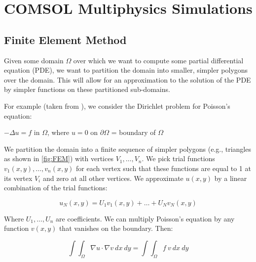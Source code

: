 \documentclass[%
 reprint,
nofootinbib,
 amsmath,amssymb,
 aps,
]{revtex4-2}
\begin{document}

\newpage
\appendix

\section{COMSOL Multiphysics Simulations}


\subsection{Finite Element Method}\label{FEM_method_Strauss}
Given some domain $\Omega$ over which we want to compute some partial differential equation (PDE), we want to partition the domain into smaller, simpler polygons over the domain. This will allow for an approximation to the solution of the PDE by simpler functions on these partitioned sub-domains.
\newline

For example (taken from \cite{Strauss_PDES}), we consider the Dirichlet problem for Poisson's equation:

\begin{center}
$ -\Delta u = f $ in $\Omega$, where $u = 0$ on $\partial \Omega$ =  boundary of $\Omega$ 
\newline
\end{center}

We partition the domain into a finite sequence of simpler polygons (e.g., triangles as shown in \ref{fig:FEM}) with vertices $V_1, \dots ,V_n$. We pick trial functions $v_1(x,y), \dots , v_n(x,y)$ for each vertex such that these functions are equal to 1 at its vertex $V_i$ and zero at all other vertices. We approximate $u(x,y)$ by a linear combination of the trial functions:

\begin{equation}\label{eq:FEM1}
     u_N(x,y) = U_1 v_1(x,y) + \dots + U_N v_N(x,y)
\end{equation}


Where $U_1, \dots , U_n$ are coefficients. We can multiply Poisson's equation by any function $v(x,y)$ that vanishes on the boundary. Then:

\begin{equation}\label{eq:v_xy}
 \int\int_{\Omega} \nabla u \cdot \nabla v \ dx  \ dy = \int \int_{\Omega} f \ v  \ dx  \ dy 
\end{equation}
\end{document}
